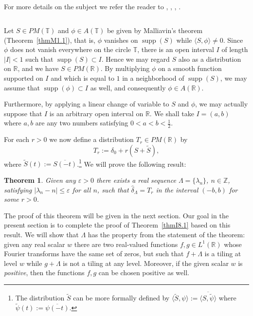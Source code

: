 \documentclass[reqno,a4paper,12pt]{amsart}
\numberwithin{equation}{section}
\numberwithin{figure}{section}
\newcommand\R{\mathbb{R}}
\newcommand\Z{\mathbb{Z}}
\newcommand\T{\mathbb{T}}
\newcommand\lam{\lambda}
\newcommand\Lam{\Lambda}
\newcommand\1{\mathds{1}}
\newcommand\eps{\varepsilon}
\renewcommand\leq{\leqslant}
\newcommand\sbt{\subset}
\newcommand{\ft}[1]{\widehat{#1}}
\newcommand{\dotprod}[2]{\langle #1 , #2 \rangle}
\newcommand{\supp}{\operatorname{supp}}
\newcommand{\half}{\tfrac{1}{2}}
\theoremstyle{plain}
\newtheorem{thm}{Theorem}[section]
\newcommand{\thmref}[1]{Theorem~\ref{#1}}
\theoremstyle{definition}
\begin{document}
For more details on the subject we refer the reader
to \cite[Chapter IX]{KS94},
\cite[Chapter V]{Kah70},
\cite[Chapter 7]{Rud62},
\cite[Chapter 3]{GM79}.





\subsection{}
Let $S \in PM(\T)$ and
$\phi \in A(\T)$ 
be given by Malliavin's theorem (\thmref{thmM1.1}), that is,
$\phi$ vanishes on $\supp(S)$
while $\dotprod{S}{\phi} \neq 0$.
Since $\phi$ does not vanish everywhere on the circle $\T$, 
there is  an open interval $I$ of length $|I| <1$ such that
$\supp(S) \sbt I$. Hence we may
regard $S$ also as a distribution on $\R$, and
we have $S \in PM(\R)$.
By multiplying $\phi$ on a smooth function supported
on $I$ and which
is equal to $1$ in a neighborhood of $\supp(S)$,
we may assume that $\supp(\phi) \sbt I$ as well,
and consequently $\phi \in A(\R)$.

Furthermore, by applying a linear change of variable
to $S$ and $\phi$, we may actually suppose that $I$ is 
an arbitrary open interval on $\R$. We shall 
take $I = (a,b)$
where $a, b$ are any two numbers satisfying $0<a<b<\half$.


For each $r>0$ we now define a distribution 
$T_r \in PM(\R)$ by
 \begin{equation}
\label{eqR14.1}
T_r  := \delta_0 + r (S + \widetilde{S}),
 \end{equation}
where $\widetilde{S}(t) := \overline{S(-t)}$.\footnote{The
distribution $\widetilde{S}$ can be more formally defined by
$\dotprod{\widetilde{S}}{\psi} := 
\overline{\dotprod{S}{\widetilde{\psi}}}
$ where $\widetilde{\psi}(t) := \overline{\psi(-t)}$.}
We will prove the following result:


 \begin{thm}
\label{thmR7.15}
Given any  $\eps >0$ there exists
 a real sequence $\Lam = \{\lam_n\}$, $n\in\Z$,
satisfying $|\lam_n - n | \leq \eps$ for all $n$,
such that $\ft{\delta}_\Lam = T_r$ in the interval $(-b,b)$
for some $r>0$.
 \end{thm}

The proof of this theorem will be given in the next section. 
 Our goal in the present section is to complete the
proof of \thmref{thmI8.1} based on this result.
We will show that $\Lam$ 
has the property from the statement of the theorem:
given any real scalar $w$ there are two real-valued functions 
$f, g \in L^1(\mathbb{R})$
whose Fourier transforms have the same set of zeros,
but such that $f + \Lambda$ is a tiling at level $w$ 
while $g + \Lambda$ is not a tiling at any level.
Moreover, if the given scalar $w$ is 
\emph{positive}, then the
functions $f, g$ can be chosen positive
as well.
\end{document}
